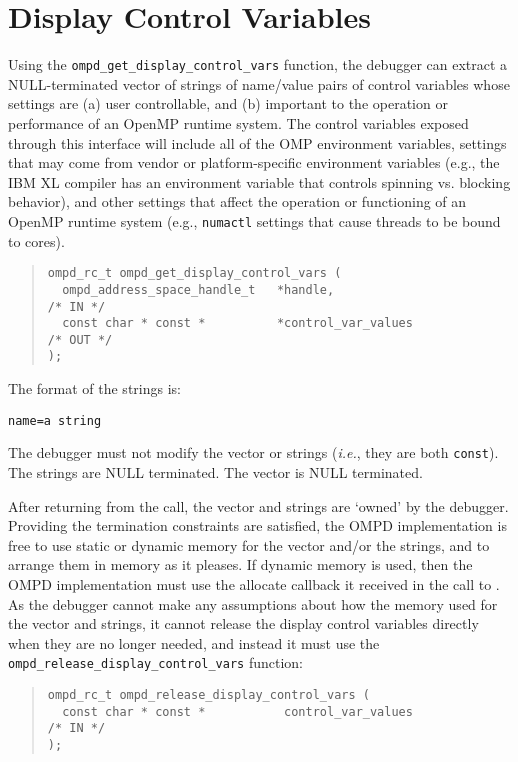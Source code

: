 \section{Display Control Variables}
Using the \verb|ompd_get_display_control_vars| function,
the debugger can extract a NULL-terminated vector of strings
of name/value pairs of control variables whose settings are
(a) user controllable, and
(b) important to the operation or performance of an OpenMP runtime system.
The control variables exposed through this interface will include all
of the OMP environment variables,
settings that may come from vendor or platform-specific
environment variables (e.g., the IBM XL compiler has an environment
variable that controls spinning vs. blocking behavior),
and other settings that affect the operation or functioning
of an OpenMP runtime system
(e.g., {\tt numactl} settings that cause threads to be bound to cores).

\begin{quote}
\begin{lstlisting}
ompd_rc_t ompd_get_display_control_vars (
  ompd_address_space_handle_t   *handle,                            /* IN */
  const char * const *          *control_var_values                /* OUT */
);
\end{lstlisting}
\end{quote}
The format of the strings is:

\centerline{\texttt{name=a string}}
\medskip
The debugger must not modify the vector or strings (\textit{i.e.},
they are both \texttt{const}).
The strings are NULL terminated.
The vector is NULL terminated.

After returning from the call, the vector and strings are `owned'
by the debugger.
Providing the termination constraints are satisfied,
the OMPD implementation is free to use static or dynamic
memory for the vector and/or the strings, and to arrange
them in memory as it pleases.
If dynamic memory is used, then the OMPD implementation
must use the allocate callback it received in the call to
.
As the debugger cannot make any assumptions about how the
memory used for the vector and strings, it cannot
release the display control variables directly when they
are no longer needed, and instead it must use the
\texttt{ompd\_release\_display\_control\_vars} function:
\begin{quote}
\begin{lstlisting}
ompd_rc_t ompd_release_display_control_vars (
  const char * const *           control_var_values                 /* IN */
);
\end{lstlisting}
\end{quote}
